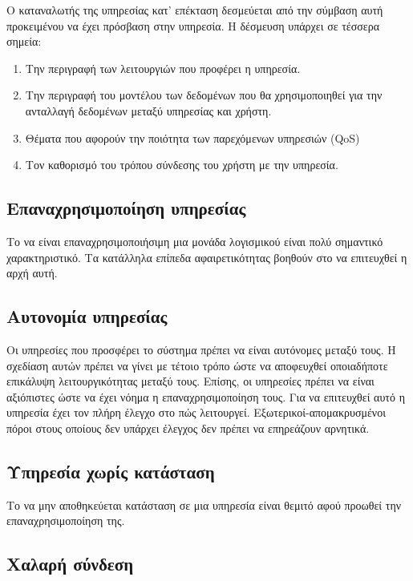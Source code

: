 Ο καταναλωτής της υπηρεσίας κατ' επέκταση δεσμεύεται από την σύμβαση 
αυτή προκειμένου να έχει πρόσβαση στην υπηρεσία. Η δέσμευση υπάρχει σε 
τέσσερα σημεία:

\begin{enumerate}
\item Την περιγραφή των λειτουργιών που προφέρει η υπηρεσία.
\item Την περιγραφή του μοντέλου των δεδομένων που θα χρησιμοποιηθεί για 
την ανταλλαγή δεδομένων μεταξύ υπηρεσίας και χρήστη.
\item Θέματα που αφορούν την ποιότητα των παρεχόμενων υπηρεσιών (QoS)
\item Τον καθορισμό του τρόπου σύνδεσης του χρήστη με την υπηρεσία.
\setcounter{numberedCntBA}{\theenumi}
\end{enumerate}

\subsection{Επαναχρησιμοποίηση υπηρεσίας}

Το να είναι επαναχρησιμοποιήσιμη μια μονάδα λογισμικού είναι 
πολύ σημαντικό χαρακτηριστικό. Τα κατάλληλα επίπεδα αφαιρετικότητας 
βοηθούν στο να επιτευχθεί η αρχή αυτή.

\subsection{Αυτονομία υπηρεσίας}

Οι υπηρεσίες που προσφέρει το σύστημα πρέπει να είναι αυτόνομες 
μεταξύ τους. Η σχεδίαση αυτών πρέπει να γίνει με τέτοιο τρόπο ώστε να 
αποφευχθεί οποιαδήποτε επικάλυψη λειτουργικότητας μεταξύ τους. Επίσης, 
οι υπηρεσίες πρέπει να είναι αξιόπιστες ώστε να έχει νόημα η 
επαναχρησιμοποίηση τους. Για να επιτευχθεί αυτό η υπηρεσία έχει τον 
πλήρη έλεγχο στο πώς λειτουργεί. Εξωτερικοί-απομακρυσμένοι πόροι στους 
οποίους δεν υπάρχει έλεγχος δεν πρέπει να επηρεάζουν αρνητικά. 

\subsection{Υπηρεσία χωρίς κατάσταση}

Το να μην αποθηκεύεται κατάσταση σε μια υπηρεσία είναι θεμιτό 
αφού προωθεί την επαναχρησιμοποίηση της.

\subsection{Χαλαρή σύνδεση}

